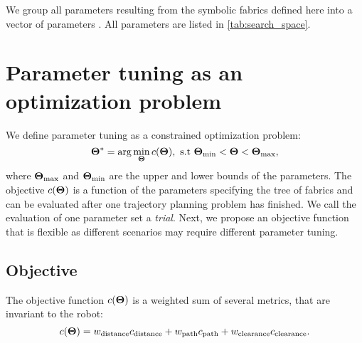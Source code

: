 We group all parameters resulting from the symbolic fabrics defined here into 
a vector of parameters \params{}. 
All parameters are listed in \cref{tab:search_space}.

\section{Parameter tuning as an optimization problem}
\label{sec:tuning}
%
We define parameter tuning as a constrained optimization problem:
\begin{equation}
    \params^{\ast} = \arg\min_{\params}\cost(\params),\ 
    \textrm{s.t}\ \params_{\textrm{min}} < \params < \params_{\textrm{max}},
    \label{eq:optimization_problem}
\end{equation}
where $\bm{\Theta}_{\textrm{max}}$ and $\bm{\Theta}_{\textrm{min}}$ are the upper and lower bounds of the parameters.
The objective $c(\bm{\Theta})$ is a function of the parameters specifying the tree of fabrics and can 
be evaluated after one trajectory planning problem has finished. We call the evaluation of one parameter set
a \textit{trial}.
Next, we propose an objective function that is flexible
as different scenarios may require different parameter tuning.
%
\subsection{Objective}
%
The objective function $c(\bm{\Theta})$ is a weighted sum of
several metrics, that are invariant to the robot:
\begin{equation}
    c(\bm{\Theta}) = 
      w_{\textrm{distance}}c_{\textrm{distance}}
    + w_{\textrm{path}}c_{\textrm{path}}
    + w_{\textrm{clearance}}c_{\textrm{clearance}}.
    \label{eq:optimization_objective}
\end{equation}

